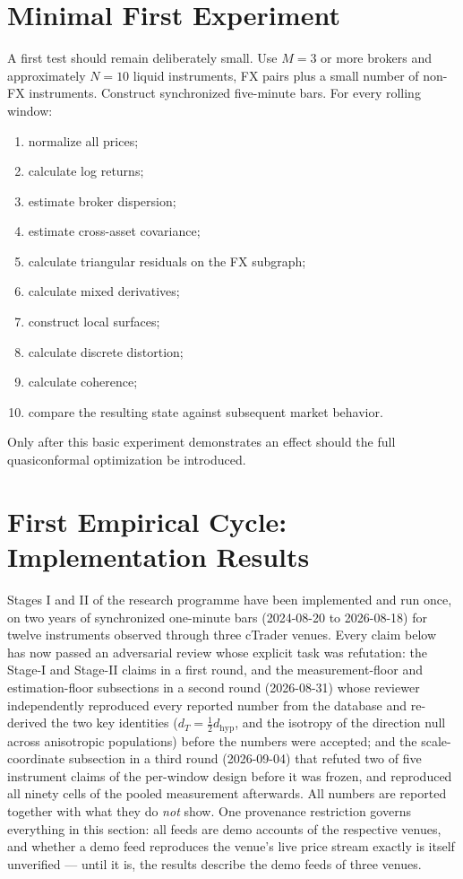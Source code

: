 \documentclass[11pt,a4paper]{article}
\numberwithin{equation}{section}
\begin{document}
\section{Minimal First Experiment}

A first test should remain deliberately small. Use $M=3$ or more
brokers and approximately $N=10$ liquid instruments, FX pairs plus a
small number of non-FX instruments. Construct synchronized
five-minute bars. For every rolling window:
\begin{enumerate}
\item normalize all prices;
\item calculate log returns;
\item estimate broker dispersion;
\item estimate cross-asset covariance;
\item calculate triangular residuals on the FX subgraph;
\item calculate mixed derivatives;
\item construct local surfaces;
\item calculate discrete distortion;
\item calculate coherence;
\item compare the resulting state against subsequent market
      behavior.
\end{enumerate}
Only after this basic experiment demonstrates an effect should the
full quasiconformal optimization be introduced.

\section{First Empirical Cycle: Implementation Results}
\label{sec:firstcycle}

Stages I and II of the research programme have been implemented and
run once, on two years of synchronized one-minute bars (2024-08-20
to 2026-08-18) for twelve instruments observed through three
cTrader venues. Every claim below has now passed an adversarial
review whose explicit task was refutation: the Stage-I and
Stage-II claims in a first round, and the measurement-floor and
estimation-floor subsections in a second round (2026-08-31) whose
reviewer independently reproduced every reported number from the
database and re-derived the two key identities
($d_T=\tfrac12 d_{\mathrm{hyp}}$, and the isotropy of the
direction null across anisotropic populations) before the numbers
were accepted; and the scale-coordinate subsection in a third round
(2026-09-04) that refuted two of five instrument claims of the
per-window design before it was frozen, and reproduced all ninety
cells of the pooled measurement afterwards. All numbers are reported together with what they do
\emph{not} show.
One provenance restriction governs everything in this section: all
feeds are demo accounts of the respective venues, and whether a
demo feed reproduces the venue's live price stream exactly is
itself unverified --- until it is, the results describe the demo
feeds of three venues.
\end{document}
